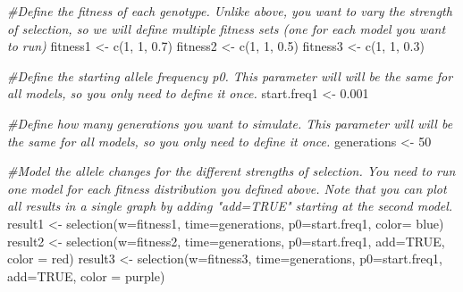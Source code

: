 \documentclass[
]{book}
\newenvironment{Shaded}{\begin{snugshade}}{\end{snugshade}}
\newcommand{\AttributeTok}[1]{\textcolor[rgb]{0.77,0.63,0.00}{#1}}
\newcommand{\CommentTok}[1]{\textcolor[rgb]{0.56,0.35,0.01}{\textit{#1}}}
\newcommand{\ConstantTok}[1]{\textcolor[rgb]{0.00,0.00,0.00}{#1}}
\newcommand{\DecValTok}[1]{\textcolor[rgb]{0.00,0.00,0.81}{#1}}
\newcommand{\FloatTok}[1]{\textcolor[rgb]{0.00,0.00,0.81}{#1}}
\newcommand{\FunctionTok}[1]{\textcolor[rgb]{0.00,0.00,0.00}{#1}}
\newcommand{\NormalTok}[1]{#1}
\newcommand{\OtherTok}[1]{\textcolor[rgb]{0.56,0.35,0.01}{#1}}
\newcommand{\StringTok}[1]{\textcolor[rgb]{0.31,0.60,0.02}{#1}}
\begin{document}
\begin{Shaded}
\begin{Highlighting}[]
\CommentTok{\#Define the fitness of each genotype. Unlike above, you want to vary the strength of selection, so we will define multiple fitness sets (one for each model you want to run)}
\NormalTok{fitness1 }\OtherTok{\textless{}{-}} \FunctionTok{c}\NormalTok{(}\DecValTok{1}\NormalTok{, }\DecValTok{1}\NormalTok{, }\FloatTok{0.7}\NormalTok{)}
\NormalTok{fitness2 }\OtherTok{\textless{}{-}} \FunctionTok{c}\NormalTok{(}\DecValTok{1}\NormalTok{, }\DecValTok{1}\NormalTok{, }\FloatTok{0.5}\NormalTok{)}
\NormalTok{fitness3 }\OtherTok{\textless{}{-}} \FunctionTok{c}\NormalTok{(}\DecValTok{1}\NormalTok{, }\DecValTok{1}\NormalTok{, }\FloatTok{0.3}\NormalTok{)}

\CommentTok{\#Define the starting allele frequency p0. This parameter will will be the same for all models, so you only need to define it once.}
\NormalTok{start.freq1 }\OtherTok{\textless{}{-}} \FloatTok{0.001}

\CommentTok{\#Define how many generations you want to simulate. This parameter will will be the same for all models, so you only need to define it once.}
\NormalTok{generations }\OtherTok{\textless{}{-}} \DecValTok{50}

\CommentTok{\#Model the allele changes for the different strengths of selection. You need to run one model for each fitness distribution you defined above. Note that you can plot all results in a single graph by adding "add=TRUE" starting at the second model. }
\NormalTok{result1 }\OtherTok{\textless{}{-}} \FunctionTok{selection}\NormalTok{(}\AttributeTok{w=}\NormalTok{fitness1, }\AttributeTok{time=}\NormalTok{generations, }\AttributeTok{p0=}\NormalTok{start.freq1, }\AttributeTok{color=} \StringTok{\textquotesingle{}blue\textquotesingle{}}\NormalTok{)}
\NormalTok{result2 }\OtherTok{\textless{}{-}} \FunctionTok{selection}\NormalTok{(}\AttributeTok{w=}\NormalTok{fitness2, }\AttributeTok{time=}\NormalTok{generations, }\AttributeTok{p0=}\NormalTok{start.freq1, }\AttributeTok{add=}\ConstantTok{TRUE}\NormalTok{, }\AttributeTok{color =} \StringTok{\textquotesingle{}red\textquotesingle{}}\NormalTok{)}
\NormalTok{result3 }\OtherTok{\textless{}{-}} \FunctionTok{selection}\NormalTok{(}\AttributeTok{w=}\NormalTok{fitness3, }\AttributeTok{time=}\NormalTok{generations, }\AttributeTok{p0=}\NormalTok{start.freq1, }\AttributeTok{add=}\ConstantTok{TRUE}\NormalTok{, }\AttributeTok{color =} \StringTok{\textquotesingle{}purple\textquotesingle{}}\NormalTok{)}
\end{Highlighting}
\end{Shaded}
\end{document}
